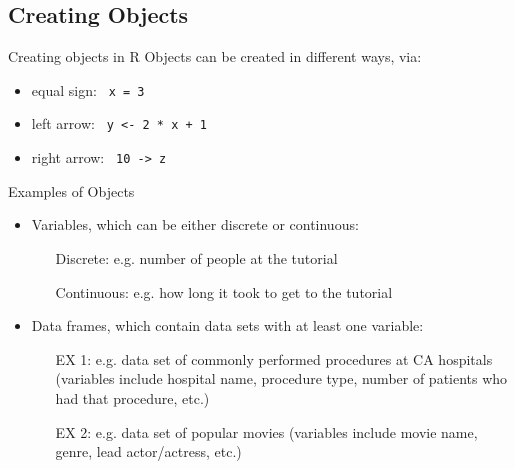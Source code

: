 \subsection{Creating Objects}
\begin{frame}
		\begin{block}{Creating objects in R}
Objects can be created in different ways, via:
			\begin{itemize}
				\item equal sign: \lstinline$ x = 3 $
				\item left arrow: \lstinline$ y <- 2 * x + 1 $
				\item right arrow: \lstinline$ 10 -> z $
			\end{itemize}
		\end{block}

\newpage
	\begin{block}{Examples of Objects}
		\begin{itemize}
			\item[]
			\item Variables, which can be either discrete or continuous:
				\begin{itemize} 
					\item[Discrete:] e.g. number of people at the tutorial
					\item[Continuous:] e.g. how long it took to get to the tutorial
				\end{itemize}
			\item[]
			\item Data frames, which contain data sets with at least one variable:
				\begin{itemize} 
					\item[EX 1:] e.g. data set of commonly performed procedures at CA hospitals (variables include hospital name, procedure type, number of patients who had that procedure, etc.)
					\item[EX 2:] e.g. data set of popular movies (variables include movie name, genre, lead actor/actress, etc.)
				\end{itemize}
		\end{itemize}
	\end{block}

\end{frame}


